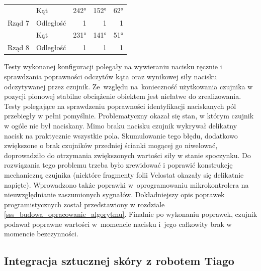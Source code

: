 \begin{table}[!h]
\begin{tabular}{|l|l|rrr|}
    & \cellcolor[HTML]{C0C0C0}Kąt       & \cellcolor[HTML]{C0C0C0}242°  & \cellcolor[HTML]{C0C0C0}152°  & \cellcolor[HTML]{C0C0C0}62°   \\
\multirow{-2}{*}{Rząd 7} & \cellcolor[HTML]{EFEFEF}Odległość & \cellcolor[HTML]{EFEFEF}1   & \cellcolor[HTML]{EFEFEF}1   & \cellcolor[HTML]{EFEFEF}1   \\ 
    & \cellcolor[HTML]{C0C0C0}Kąt       & \cellcolor[HTML]{C0C0C0}231°  & \cellcolor[HTML]{C0C0C0}141°  & \cellcolor[HTML]{C0C0C0}51°   \\
\multirow{-2}{*}{Rząd 8} & \cellcolor[HTML]{EFEFEF}Odległość & \cellcolor[HTML]{EFEFEF}1   & \cellcolor[HTML]{EFEFEF}1   & \cellcolor[HTML]{EFEFEF}1  \\
\hline
\end{tabular}
\label{t_szkielet_config}
\end{table}

Testy wykonanej konfiguracji polegały na wywieraniu nacisku ręcznie i sprawdzania poprawności odczytów kąta oraz wynikowej siły nacisku odczytywanej przez czujnik. Ze~względu na~konieczność użytkowania czujnika w pozycji pionowej stabilne obciążenie obiektem jest niełatwe do zrealizowania. Testy polegające na sprawdzeniu poprawności identyfikacji naciskanych pól przebiegły w pełni pomyślnie. Problematyczny okazał się stan, w którym czujnik w ogóle nie był naciskany. Mimo braku nacisku czujnik wykrywał delikatny nacisk na praktycznie wszystkie pola. Skumulowanie tego błędu, dodatkowo zwiększone o brak czujników przedniej ścianki mogącej go niwelować, doprowadziło do otrzymania zwiększonych wartości siły w stanie spoczynku. Do rozwiązania tego problemu trzeba było zrewidować i poprawić konstrukcję mechaniczną czujnika (niektóre fragmenty folii Velostat okazały się delikatnie napięte). Wprowadzono także poprawki w~oprogramowaniu mikrokontrolera na nieuwzględnianie zaszumionych sygnałów. Dokładniejszy opis poprawek programistycznych został przedstawiony w rozdziale \ref{sss_budowa_opracowanie_algorytmu}. Finalnie po wykonaniu poprawek, czujnik podawał poprawne wartości w~momencie nacisku i~jego całkowity brak w momencie bezczynności.

\subsection{Integracja sztucznej skóry z robotem Tiago}
\label{ss_integracja_Python}

